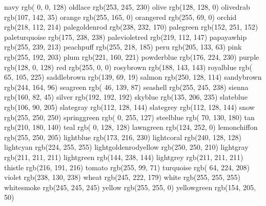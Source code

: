navy rgb( 0, 0, 128)
oldlace rgb(253, 245, 230)
olive rgb(128, 128, 0)
olivedrab rgb(107, 142, 35)
orange rgb(255, 165, 0)
orangered rgb(255, 69, 0)
orchid rgb(218, 112, 214)
palegoldenrod rgb(238, 232, 170)
palegreen rgb(152, 251, 152)
paleturquoise rgb(175, 238, 238)
palevioletred rgb(219, 112, 147)
papayawhip rgb(255, 239, 213)
peachpuff rgb(255, 218, 185)
peru rgb(205, 133, 63)
pink rgb(255, 192, 203)
plum rgb(221, 160, 221)
powderblue rgb(176, 224, 230)
purple rgb(128, 0, 128)
red rgb(255, 0, 0)
rosybrown rgb(188, 143, 143)
royalblue rgb( 65, 105, 225)
saddlebrown rgb(139, 69, 19)
salmon rgb(250, 128, 114)
sandybrown rgb(244, 164, 96)
seagreen rgb( 46, 139, 87)
seashell rgb(255, 245, 238)
sienna rgb(160, 82, 45)
silver rgb(192, 192, 192)
skyblue rgb(135, 206, 235)
slateblue rgb(106, 90, 205)
slategray rgb(112, 128, 144)
slategrey rgb(112, 128, 144)
snow rgb(255, 250, 250)
springgreen rgb( 0, 255, 127)
steelblue rgb( 70, 130, 180)
tan rgb(210, 180, 140)
teal rgb( 0, 128, 128)
lawngreen rgb(124, 252, 0)
lemonchiffon rgb(255, 250, 205)
lightblue rgb(173, 216, 230)
lightcoral rgb(240, 128, 128)
lightcyan rgb(224, 255, 255)
lightgoldenrodyellow rgb(250, 250, 210)
lightgray rgb(211, 211, 211)
lightgreen rgb(144, 238, 144)
lightgrey rgb(211, 211, 211)
thistle rgb(216, 191, 216)
tomato rgb(255, 99, 71)
turquoise rgb( 64, 224, 208)
violet rgb(238, 130, 238)
wheat rgb(245, 222, 179)
white rgb(255, 255, 255)
whitesmoke rgb(245, 245, 245)
yellow rgb(255, 255, 0)
yellowgreen rgb(154, 205, 50)